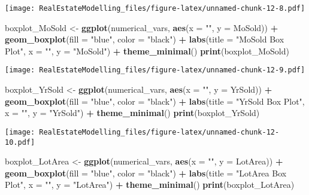 \documentclass[
]{article}
\newenvironment{Shaded}{\begin{snugshade}}{\end{snugshade}}
\newcommand{\AttributeTok}[1]{\textcolor[rgb]{0.13,0.29,0.53}{#1}}
\newcommand{\FunctionTok}[1]{\textcolor[rgb]{0.13,0.29,0.53}{\textbf{#1}}}
\newcommand{\NormalTok}[1]{#1}
\newcommand{\OtherTok}[1]{\textcolor[rgb]{0.56,0.35,0.01}{#1}}
\newcommand{\SpecialCharTok}[1]{\textcolor[rgb]{0.81,0.36,0.00}{\textbf{#1}}}
\newcommand{\StringTok}[1]{\textcolor[rgb]{0.31,0.60,0.02}{#1}}
\begin{document}
\texttt{[image: RealEstateModelling\_files/figure-latex/unnamed-chunk-12-8.pdf]}

\begin{Shaded}
\begin{Highlighting}[]
\NormalTok{boxplot\_MoSold }\OtherTok{\textless{}{-}} \FunctionTok{ggplot}\NormalTok{(numerical\_vars, }\FunctionTok{aes}\NormalTok{(}\AttributeTok{x =} \StringTok{""}\NormalTok{, }\AttributeTok{y =}\NormalTok{ MoSold)) }\SpecialCharTok{+}
  \FunctionTok{geom\_boxplot}\NormalTok{(}\AttributeTok{fill =} \StringTok{"blue"}\NormalTok{, }\AttributeTok{color =} \StringTok{"black"}\NormalTok{) }\SpecialCharTok{+}
  \FunctionTok{labs}\NormalTok{(}\AttributeTok{title =} \StringTok{"MoSold Box Plot"}\NormalTok{, }\AttributeTok{x =} \StringTok{""}\NormalTok{, }\AttributeTok{y =} \StringTok{"MoSold"}\NormalTok{) }\SpecialCharTok{+}
  \FunctionTok{theme\_minimal}\NormalTok{()}
\FunctionTok{print}\NormalTok{(boxplot\_MoSold)}
\end{Highlighting}
\end{Shaded}

\texttt{[image: RealEstateModelling\_files/figure-latex/unnamed-chunk-12-9.pdf]}

\begin{Shaded}
\begin{Highlighting}[]
\NormalTok{boxplot\_YrSold }\OtherTok{\textless{}{-}} \FunctionTok{ggplot}\NormalTok{(numerical\_vars, }\FunctionTok{aes}\NormalTok{(}\AttributeTok{x =} \StringTok{""}\NormalTok{, }\AttributeTok{y =}\NormalTok{ YrSold)) }\SpecialCharTok{+}
  \FunctionTok{geom\_boxplot}\NormalTok{(}\AttributeTok{fill =} \StringTok{"blue"}\NormalTok{, }\AttributeTok{color =} \StringTok{"black"}\NormalTok{) }\SpecialCharTok{+}
  \FunctionTok{labs}\NormalTok{(}\AttributeTok{title =} \StringTok{"YrSold Box Plot"}\NormalTok{, }\AttributeTok{x =} \StringTok{""}\NormalTok{, }\AttributeTok{y =} \StringTok{"YrSold"}\NormalTok{) }\SpecialCharTok{+}
  \FunctionTok{theme\_minimal}\NormalTok{()}
\FunctionTok{print}\NormalTok{(boxplot\_YrSold)}
\end{Highlighting}
\end{Shaded}

\texttt{[image: RealEstateModelling\_files/figure-latex/unnamed-chunk-12-10.pdf]}

\begin{Shaded}
\begin{Highlighting}[]
\NormalTok{boxplot\_LotArea }\OtherTok{\textless{}{-}} \FunctionTok{ggplot}\NormalTok{(numerical\_vars, }\FunctionTok{aes}\NormalTok{(}\AttributeTok{x =} \StringTok{""}\NormalTok{, }\AttributeTok{y =}\NormalTok{ LotArea)) }\SpecialCharTok{+}
  \FunctionTok{geom\_boxplot}\NormalTok{(}\AttributeTok{fill =} \StringTok{"blue"}\NormalTok{, }\AttributeTok{color =} \StringTok{"black"}\NormalTok{) }\SpecialCharTok{+}
  \FunctionTok{labs}\NormalTok{(}\AttributeTok{title =} \StringTok{"LotArea Box Plot"}\NormalTok{, }\AttributeTok{x =} \StringTok{""}\NormalTok{, }\AttributeTok{y =} \StringTok{"LotArea"}\NormalTok{) }\SpecialCharTok{+}
  \FunctionTok{theme\_minimal}\NormalTok{()}
\FunctionTok{print}\NormalTok{(boxplot\_LotArea)}
\end{Highlighting}
\end{Shaded}
\end{document}
